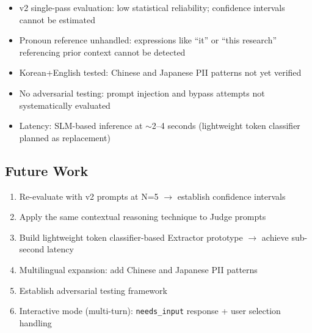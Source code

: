 \documentclass[11pt,a4paper]{article}
\begin{document}
\begin{itemize}[nosep]
  \item v2 single-pass evaluation: low statistical reliability; confidence intervals cannot be estimated
  \item Pronoun reference unhandled: expressions like ``it'' or ``this research'' referencing prior context cannot be detected
  \item Korean+English tested: Chinese and Japanese PII patterns not yet verified
  \item No adversarial testing: prompt injection and bypass attempts not systematically evaluated
  \item Latency: SLM-based inference at $\sim$2--4 seconds (lightweight token classifier planned as replacement)
\end{itemize}

\subsection{Future Work}

\begin{enumerate}[nosep]
  \item Re-evaluate with v2 prompts at N=5 $\rightarrow$ establish confidence intervals
  \item Apply the same contextual reasoning technique to Judge prompts
  \item Build lightweight token classifier-based Extractor prototype $\rightarrow$ achieve sub-second latency
  \item Multilingual expansion: add Chinese and Japanese PII patterns
  \item Establish adversarial testing framework
  \item Interactive mode (multi-turn): \texttt{needs\_input} response + user selection handling
\end{enumerate}
\end{document}

